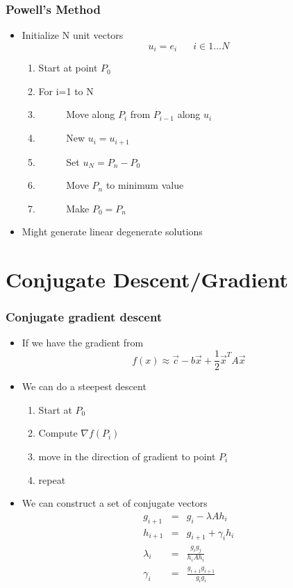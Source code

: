 \documentclass[10pt]{beamer}
\begin{document}
\begin{frame}
  \frametitle{Powell's Method}
  \begin{itemize}
  \item Initialize N unit vectors
    \[
      u_i = e_i \mbox{ ~~~ } i\in 1 ... N
    \]
    \begin{enumerate}
    \item Start at point $P_0$
    \item For i=1 to N
    \item \mbox{ ~~~ } Move along $P_i$ from $P_{i-1}$ along $u_i$
    \item \mbox{ ~~~ } New $u_i = u_{i+1}$
    \item \mbox{ ~~~ } Set $u_N = P_n - P_0$
    \item \mbox{ ~~~ } Move $P_n$ to minimum value 
    \item \mbox{ ~~~ } Make $P_0 = P_n$
    \end{enumerate}
  \item Might generate linear degenerate solutions
  \end{itemize}
\end{frame}

\section{Conjugate Descent/Gradient}
\label{sec:conj-desc}

\begin{frame}
  \frametitle{Conjugate gradient descent}
  \begin{itemize}
  \item If we have the gradient from
    \[
      f(x) \approx \vec{c} - b \vec{x} + \frac{1}{2} \vec{x}^T A \vec{x}
    \]
  \item We can do a steepest descent
    \begin{enumerate}
    \item Start at $P_0$
    \item Compute $\nabla f(P_i)$
    \item move in the direction of gradient to point $P_i$
    \item repeat
    \end{enumerate}
  \item We can construct a set of conjugate vectors
    \[
      \begin{array}{ccc}
        g_{i+1} & = & g_i - \lambda A h_i \\
        h_{i+1} & = & g_{i+1} + \gamma_i h_i\\
        \lambda_i & = & \frac{ g_i g_j }{ h_i A h_i }\\
        \gamma_i &=& \frac{g_{i+1} g_{i+1}}{ g_i g_i }\\
      \end{array}
    \]
  \end{itemize}
\end{frame}
\end{document}
